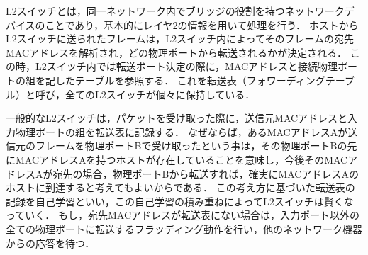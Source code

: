 L2スイッチとは，同一ネットワーク内でブリッジの役割を持つネットワークデバイスのことであり，基本的にレイヤ2の情報を用いて処理を行う\cite{masteringtcpip}．
ホストからL2スイッチに送られたフレームは，L2スイッチ内によってそのフレームの宛先MACアドレスを解析され，どの物理ポートから転送されるかが決定される．
この時，L2スイッチ内では転送ポート決定の際に，MACアドレスと接続物理ポートの組を記したテーブルを参照する．
これを転送表（フォワーディングテーブル）と呼び，全てのL2スイッチが個々に保持している．

一般的なL2スイッチは，パケットを受け取った際に，送信元MACアドレスと入力物理ポートの組を転送表に記録する．
なぜならば，あるMACアドレスAが送信元のフレームを物理ポートBで受け取ったという事は，その物理ポートBの先にMACアドレスAを持つホストが存在していることを意味し，今後そのMACアドレスAが宛先の場合，物理ポートBから転送すれば，確実にMACアドレスAのホストに到達すると考えてもよいからである．
この考え方に基づいた転送表の記録を自己学習といい，この自己学習の積み重ねによってL2スイッチは賢くなっていく．
もし，宛先MACアドレスが転送表にない場合は，入力ポート以外の全ての物理ポートに転送するフラッディング動作を行い，他のネットワーク機器からの応答を待つ．